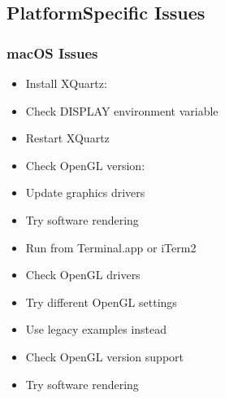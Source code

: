 \documentclass[a4paper,10pt,english,openany,oneside]{sphinxmanual}
\begin{document}
\subsection{Platform\sphinxhyphen{}Specific Issues}
\label{\detokenize{troubleshooting:platform-specific-issues}}

\subsubsection{macOS Issues}
\label{\detokenize{troubleshooting:macos-issues}}\begin{description}
\begin{itemize}
\item {} 
\sphinxAtStartPar
Install XQuartz: 

\item {} 
\sphinxAtStartPar
Check DISPLAY environment variable

\item {} 
\sphinxAtStartPar
Restart XQuartz

\end{itemize}

\begin{itemize}
\item {} 
\sphinxAtStartPar
Check OpenGL version: 

\item {} 
\sphinxAtStartPar
Update graphics drivers

\item {} 
\sphinxAtStartPar
Try software rendering

\end{itemize}

\begin{itemize}
\item {} 
\sphinxAtStartPar
Run from Terminal.app or iTerm2

\item {} 
\sphinxAtStartPar
Check OpenGL drivers

\item {} 
\sphinxAtStartPar
Try different OpenGL settings

\end{itemize}

\begin{itemize}
\item {} 
\sphinxAtStartPar
Use legacy examples instead

\item {} 
\sphinxAtStartPar
Check OpenGL version support

\item {} 
\sphinxAtStartPar
Try software rendering

\end{itemize}

\end{description}
\end{document}
